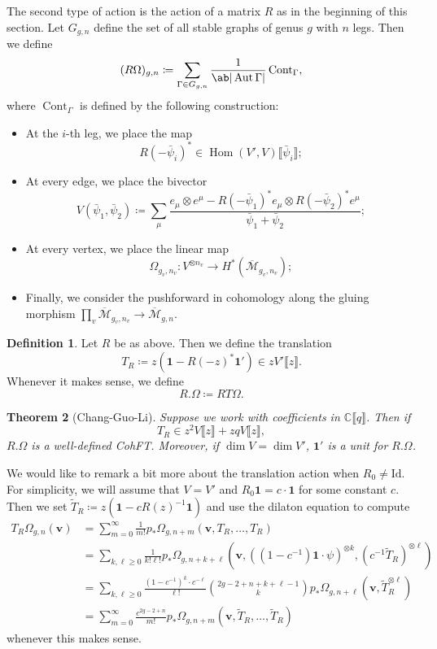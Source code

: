 \documentclass{amsart}
\newtheorem{thm}{Theorem}[section]
\theoremstyle{definition}
\newtheorem{defn}[thm]{Definition}
\theoremstyle{remark}
\theoremstyle{plain}
\theoremstyle{definition}
\theoremstyle{remark}
\newcommand{\C}{\mathbb{C}}
\newcommand{\Mbar}{\overline{\mathcal{M}}}
\newcommand{\mbf}[1]{\mathbf{#1}}
\newcommand{\bv}{\mbf{v}}
\newcommand{\mr}[1]{\mathrm{#1}}
\newcommand{\on}[1]{\operatorname{#1}}
\newcommand{\1}{\mathbf{1}}
\newcommand{\2}{\mathbf{2}}
\newcommand{\3}{\mathbf{3}}
\newcommand{\ps}[1]{\llbracket #1 \rrbracket}
\DeclareMathOperator{\Hom}{Hom}
\DeclareMathOperator{\Aut}{Aut}
\begin{document}
The second type of action is the action of a matrix $R$ as in the beginning of this section. Let $G_{g,n}$ define the set of all stable graphs of genus $g$ with $n$ legs. Then we define
\[ (R\Omega)_{g,n} \coloneqq \sum_{\Gamma \in G_{g,n}} \frac{1}{\ab|\Aut \Gamma|} \on{Cont}_{\Gamma}, \]
where $\on{Cont}_{\Gamma}$ is defined by the following construction:
\begin{itemize}
    \item At the $i$-th leg, we place the map 
        \[ R(-\bar{\psi}_i)^* \in \Hom(V',V) \ps{\bar{\psi}_i}; \]
    \item At every edge, we place the bivector
        \[ V(\bar{\psi}_1, \bar{\psi}_2) \coloneqq \sum_{\mu} \frac{e_{\mu} \otimes e^{\mu} - R(-\bar{\psi}_1)^* e_{\mu} \otimes R(-\bar{\psi}_2)^* e^{\mu}}{\bar{\psi}_1 + \bar{\psi}_2}; \]
    \item At every vertex, we place the linear map
        \[ \Omega_{g_v, n_v} \colon V^{\otimes n_v} \to H^*(\Mbar_{g_v, n_v}); \]
    \item Finally, we consider the pushforward in cohomology along the gluing morphism $\prod_v \Mbar_{g_v, n_v} \to \Mbar_{g,n}$.
\end{itemize}

\begin{defn}
    Let $R$ be as above. Then we define the translation
    \[ T_R \coloneqq z (\1 - R(-z)^* \1') \in z V'\ps{z}. \]
    Whenever it makes sense, we define
    \[ R.\Omega \coloneqq RT\Omega. \]
\end{defn}

\begin{thm}[Chang-Guo-Li]
    Suppose we work with coefficients in $\C\ps{q}$. Then if
    \[ T_R \in z^2 V \ps{z} + zq V \ps{z}, \]
    $R.\Omega$ is a well-defined CohFT. Moreover, if $\dim V = \dim V'$, $\1'$ is a unit for $R.\Omega$.
\end{thm}

We would like to remark a bit more about the translation action when $R_0 \neq \mr{Id}$. For simplicity, we will assume that $V = V'$ and $R_0 \1 = c \cdot \1$ for some constant $c$. Then we set $\tilde{T}_R \coloneqq z( \1 - c R(z)^{-1} \1)$ and use the dilaton equation to compute
\begin{align*}
    T_R \Omega_{g,n}(\bv) &= \sum_{m=0}^{\infty} \frac{1}{m!} p_*\Omega_{g,n+m}(\bv, T_R, \ldots, T_R) \\
    &= \sum_{k,\ell \geq 0} \frac{1}{k!\ell!} p_* \Omega_{g,n+k+\ell}(\bv, ( (1-c^{-1})\1 \cdot \psi )^{\otimes k}, ( c^{-1} \tilde{T}_R )^{\otimes \ell}) \\
    &= \sum_{k,\ell \geq 0} \frac{(1-c^{-1})^k \cdot c^{-\ell}}{\ell!} \binom{2g-2+n+k+\ell-1}{k} p_* \Omega_{g,n+\ell}(\bv, \tilde{T}_R^{\otimes \ell}) \\
    &= \sum_{m=0}^{\infty} \frac{c^{2g-2+n}}{m!} p_* \Omega_{g,n+m}(\bv, \tilde{T}_R, \ldots, \tilde{T}_R)
\end{align*}
whenever this makes sense.
\end{document}
